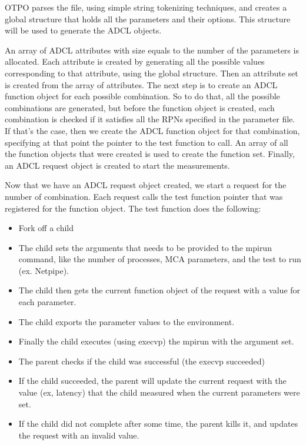 OTPO parses the file, using simple string tokenizing techniques, and creates a
global structure that holds all the parameters and their options. This
structure will be used to generate the ADCL objects. 

An array of ADCL attributes with size equals to the number of the parameters
is allocated. Each attribute is created by generating all the possible values
corresponding to that attribute, using the global structure. Then an attribute
set is created from the array of attributes. The next step is to create an
ADCL function object for each possible combination. So to do that, all the
possible combinations are generated, but before the function object is
created, each combination is checked if it satisfies all the RPNs specified in
the parameter file. If that's the case, then we create the ADCL function
object for that combination, specifying at that point the pointer to the test
function to call. An array of all the function objects that were created is
used to create the function set. Finally, an ADCL request object is created to
start the measurements.

Now that we have an ADCL request object created, we start a request for the
number of combination. Each request calls the test function pointer that was
registered for the function object. The test function does the following:
\begin{itemize}
\item Fork off a child
\item The child sets the arguments that needs to be provided to the mpirun
  command, like the number of processes, MCA parameters, and the test to run
  (ex. Netpipe).
\item The child then gets the current function object of the request with a
  value for each parameter.
\item The child exports the parameter values to the environment.
\item Finally the child executes (using execvp) the mpirun with the argument
  set.
\item The parent checks if the child was successful (the execvp succeeded)
\item If the child succeeded, the parent will update the current request with
  the value (ex, latency) that the child measured when the current parameters
  were set.
\item If the child did not complete after some time, the parent kills it, and
  updates the request with an invalid value.
\end{itemize}

